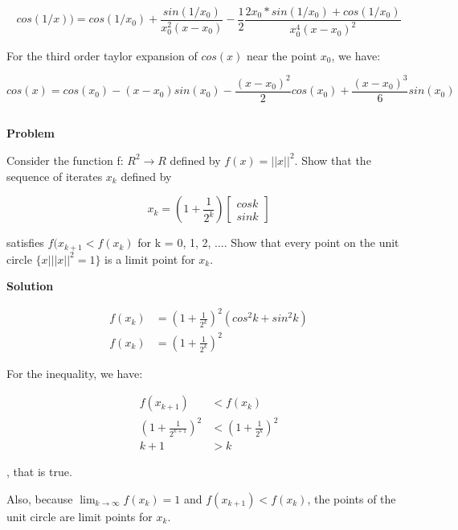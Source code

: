 \documentclass[a4paper,11pt]{article}
\numberwithin{equation}{section} %
\begin{document}
\begin{equation}
cos(1/x)) = cos(1/x_0) + \frac{sin(1/x_0)}{x_0^2 (x-x_0)} - \frac{1}{2} \frac{2x_0*sin(1/x_0) + cos(1/x_0)}{x_0^4(x-x_0)^2}
\end{equation}

For the third order taylor expansion of $cos(x)$ near the point $x_0$, we have:

\begin{equation}
    cos(x) = cos(x_0) - (x-x_0)sin(x_0) - \frac{(x-x_0)^2}{2}cos(x_0) + \frac{(x-x_0)^3}{6}sin(x_0)
\end{equation}

\subsection{}

\textbf{Problem}

Consider the function f: $R^2 \rightarrow R$ defined by $f(x) = {||x||}^2$. Show that the sequence of iterates {$x_k$} defined by

\[x_k = (1 + \frac{1}{2^k}) \begin{bmatrix}
    cosk \\ sink
\end{bmatrix}\]

satisfies $f(x_{k+1} < f(x_k)$ for k = 0, 1, 2, .... Show that every point on the unit circle $\{x | {||x||}^2 = 1\}$ is a limit point for {$x_k$}.

\textbf{Solution}

\begin{align}
    f(x_k) &= (1+\frac{1}{2^k})^2(cos^2k + sin^2k) \\
    f(x_k) &= (1+\frac{1}{2^k})^2
\end{align}

For the inequality, we have:

\begin{align}
    f(x_{k+1}) &< f(x_k) \\
    (1 + \frac{1}{2^{k+1}})^2 &< (1 + \frac{1}{2^k})^2 \\
    k+1 &> k
\end{align}

, that is true.

Also, because $\lim_{k\to\infty} f(x_k) = 1$ and $f(x_{k+1}) < f(x_k)$, the points of the unit circle are limit points for {$x_k$}.

\subsection{}
\end{document}

